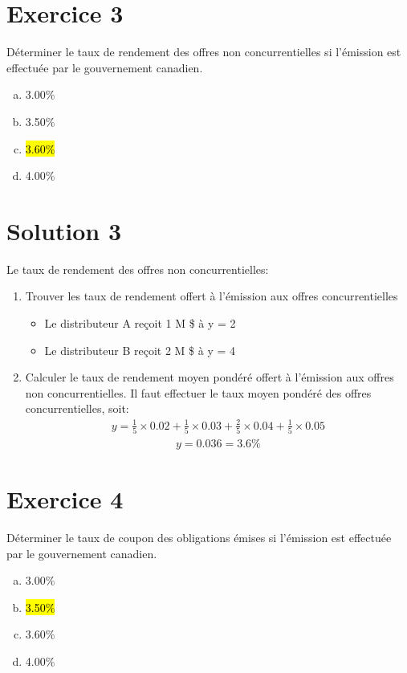 \documentclass[10pt,a4paper]{article}
\begin{document}
\newpage

\section*{Exercice 3}
Déterminer le taux de rendement des offres non concurrentielles si l'émission est effectuée par le gouvernement canadien.

\begin{enumerate}[a)]
\item 3.00\%
\item 3.50\%
\item \hl{3.60\%}
\item 4.00\%
\end{enumerate}

\section*{Solution 3}
Le taux de rendement des offres non concurrentielles:
\begin{enumerate}
\item Trouver les taux de rendement offert à l'émission aux offres concurrentielles
\begin{itemize}
\item Le distributeur A reçoit 1 M \$ à y = 2 %
\item Le distributeur B reçoit 2 M \$ à y = 4 %
\end{itemize}
\item Calculer le taux de rendement moyen pondéré offert à l'émission aux offres non concurrentielles. 
Il faut effectuer le taux moyen pondéré des offres concurrentielles, soit:
\begin{align*}
y=\frac{1}{5} \times 0.02+\frac{1}{5} \times 0.03+\frac{2}{5}\times 0.04 + \frac{1}{5} \times 0.05
\end{align*}
\begin{align*}
y=0.036=3.6\%
\end{align*}
\end{enumerate}


\newpage


\section*{Exercice 4}
Déterminer le taux de coupon des obligations émises si l'émission est effectuée par le gouvernement canadien.

\begin{enumerate}[a)]
\item 3.00\%
\item \hl{3.50\%}
\item 3.60\%
\item 4.00\%
\end{enumerate}
\end{document}
